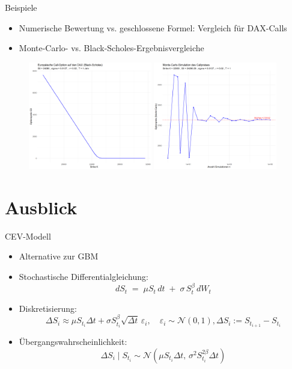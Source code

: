\documentclass{beamer}
\begin{document}
\begin{frame}{Beispiele}
  \begin{itemize}
      \item Numerische Bewertung vs. geschlossene Formel: Vergleich für DAX-Calls
      \item Monte-Carlo- vs. Black-Scholes-Ergebnisvergleiche
  \end{itemize}
  \begin{figure}
    \centering
  \includegraphics[width=0.48\textwidth]{../thesis/images/call_dax_bs.png}
  \includegraphics[width=0.48\textwidth]{../thesis/images/call_dax_mc.png}
  \end{figure}
\end{frame}

\section{Ausblick}

\begin{frame}{CEV-Modell}
  \begin{itemize}
    \item Alternative zur GBM
    \item Stochastische Differentialgleichung: $$dS_t \;=\; \mu S_t\,dt \;+\; \sigma\,S_t^{\beta}\,dW_t$$
    \item Diskretisierung: $$\Delta S_i \approx \mu S_{t_i}\Delta t + \sigma S_{t_i}^{\beta}\sqrt{\Delta t}\,\varepsilon_i,\quad \varepsilon_i\sim\mathcal N(0,1),\Delta S_i := S_{t_{i+1}} - S_{t_i}$$
    \item Übergangswahrscheinlichkeit: $$\Delta S_i \mid S_{t_i} \sim \mathcal N\left(\mu S_{t_i} \Delta t,\, \sigma^2 S_{t_i}^{2\beta} \Delta t\right)$$
  \end{itemize}
\end{frame}
\end{document}
